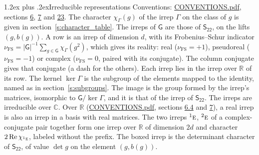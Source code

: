 \documentclass[10pt,a4paper]{article}
\makeatletter
\renewcommand\section{\@startsection{section}{1}{\z@}{-3ex plus -1ex minus -.2ex}%
  {1.2ex plus .2ex}{\normalfont\large\sffamily\bfseries\color{parttitle}}}
\numberwithin{equation}{section}
\newcommand{\grp}[1]{\mathsf{#1}}
\newcommand{\irr}[1]{\text{\normalfont\scshape #1}}
\newcommand{\conjpair}[1]{{}^{#1}}
\newcommand{\irchar}[1]{\chi_{#1}}
\newcommand{\fsind}{\nu_{\mathrm{FS}}}
\makeatother
\begin{document}
\section{Irreducible representations}\label{s:irreps}
Conventions: \href{../../CONVENTIONS.pdf}{CONVENTIONS.pdf}, sections \href{../../../rotation/CONVENTIONS.pdf\#conv.6}{6}, \href{../../../rotation/CONVENTIONS.pdf\#conv.7}{7} and \href{../../CONVENTIONS.pdf\#conv.23}{23}.
\leavevmode\label{n:function.character}\label{n:irrep.Gamma}The character $\irchar{\Gamma}(g)$ of the irrep $\Gamma$ on the class of $g$ is given in section~\ref{s:character_table}. The irreps of $\grp{G}$ are those of \href{../../../rotation/data/pdf/S22.pdf}{$\grp{S_{22}}$}, on the lifts $(g, b(g))$.
\leavevmode\label{n:index.dimension}\label{n:index.frobenius}\label{n:head.irrep}\label{n:head.reality}A row is an irrep of dimension $d$, with its Frobenius--Schur indicator $\fsind = |\grp{G}|^{-1}\allowbreak\sum_{g\in\grp{G}}\irchar{\Gamma}(g^2)$, which gives its reality: real ($\fsind = +1$), pseudoreal ($\fsind = -1$) or complex ($\fsind = 0$, paired with its conjugate). \label{n:head.conjugate}The column conjugate gives that conjugate (a dash for the others). \label{n:head.over.real}Each irrep lies in the irrep over $\mathbb{R}$ of its row. \label{n:head.kernel}The kernel $\ker\Gamma$ is the subgroup of the elements mapped to the identity, named as in section~\ref{s:subgroups}. \label{n:head.image}The image is the group formed by the irrep's matrices, isomorphic to $\grp{G}/\ker\Gamma$, and it is that of the irrep of \href{../../../rotation/data/pdf/S22.pdf}{$\grp{S_{22}}$}. The irreps are irreducible over $\mathbb{C}$. Over $\mathbb{R}$ (\href{../../CONVENTIONS.pdf}{CONVENTIONS.pdf}, sections \href{../../../rotation/CONVENTIONS.pdf\#conv.6.4}{6.4} and \href{../../../rotation/CONVENTIONS.pdf\#conv.7}{7}), a real irrep is also an irrep in a basis with real matrices. The two irreps $\conjpair{1}\irr{e}$, $\conjpair{2}\irr{e}$ of a complex-conjugate pair together form one irrep over $\mathbb{R}$ of dimension $2d$ and character $2\operatorname{Re}\irchar{\conjpair{1}\irr{e}}$, labeled without the prefix. \label{n:mark.determinant}The boxed irrep is the determinant character of \href{../../../rotation/data/pdf/S22.pdf}{$\grp{S_{22}}$}, of value $\det g$ on the element $(g, b(g))$.
\setlength{\emergencystretch}{2em}\par\setlength{\emergencystretch}{0pt}
\end{document}
